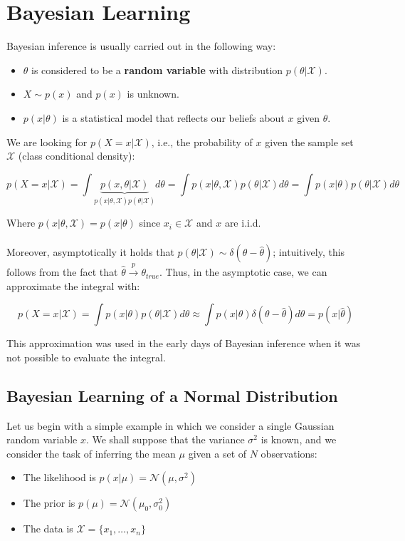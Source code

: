 \documentclass[twoside]{article}
\begin{document}
\section{Bayesian Learning}
Bayesian inference is usually carried out in the following way:

\begin{itemize}
    \item $\theta$ is considered to be a \textbf{random variable}  with distribution $p(\theta|\mathcal{X})$.
    \item $X \sim p(x)$  and $p(x)$ is unknown. 
    \item  $p(x|\theta)$ is  a statistical model that reflects our beliefs about $x$ given $\theta$.
\end{itemize}

We are looking for $p(X=x|\mathcal{X})$, i.e., the probability of $x$ given the sample set $\mathcal{X}$ (class conditional density):

$$p(X=x|\mathcal{X}) = \int \underbrace{p(x,\theta|\mathcal{X})}_{p(x|\theta,\mathcal{X})p(\theta|\mathcal{X})}d\theta =
\int p(x|\theta,\mathcal{X})p(\theta|\mathcal{X})d\theta = \int p(x|\theta)p(\theta|\mathcal{X})d\theta  $$

Where $p(x|\theta,\mathcal{X})= p(x|\theta)$ since $x_i \in \mathcal{X}$ and $x$ are i.i.d.\\\\
Moreover, asymptotically it holds that $p(\theta| \mathcal{X}) \sim \delta(\theta- \hat{\theta}) $; intuitively, this follows from the fact that $\hat{\theta}  \overset{p}{\to} \theta_{true}$. Thus, in the asymptotic case, we can approximate the integral with:

$$p(X=x|\mathcal{X}) = \int p(x|\theta)p(\theta|\mathcal{X})d\theta \approx
\int p(x|\theta) \delta(\theta- \hat{\theta})d\theta  = p(x|\hat{\theta}) $$

This approximation was used in the early days of Bayesian inference when it was not possible to evaluate the integral. 
\newpage
\subsection{Bayesian Learning of a Normal Distribution}
Let us begin with a simple example in which we consider a single Gaussian random variable $x$. We shall suppose that the variance $\sigma^2$ is known, and we consider the task of inferring the mean $\mu$ given a set of $N$ observations:
\begin{itemize}
    \item The likelihood is $p(x|\mu)= \mathcal{N}(\mu,\sigma^2)$
    \item The prior is $p(\mu) = \mathcal{N}(\mu_0,\sigma_0^2)$
    \item The data is $\mathcal{X} = \{x_1,\ldots,x_n\}$
\end{itemize}
\end{document}
